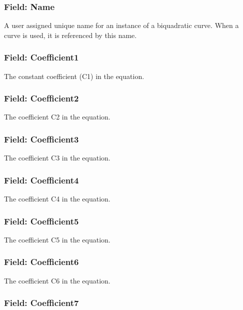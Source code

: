 \subsubsection{Field: Name}\label{field-name-9-011}

A user assigned unique name for an instance of a biquadratic curve. When a curve is used, it is referenced by this name.

\subsubsection{Field: Coefficient1}\label{field-coefficient1}

The constant coefficient (C1) in the equation.

\subsubsection{Field: Coefficient2}\label{field-coefficient2}

The coefficient C2 in the equation.

\subsubsection{Field: Coefficient3}\label{field-coefficient3}

The coefficient C3 in the equation.

\subsubsection{Field: Coefficient4}\label{field-coefficient4}

The coefficient C4 in the equation.

\subsubsection{Field: Coefficient5}\label{field-coefficient5}

The coefficient C5 in the equation.

\subsubsection{Field: Coefficient6}\label{field-coefficient6}

The coefficient C6 in the equation.

\subsubsection{Field: Coefficient7}\label{field-coefficient7}


